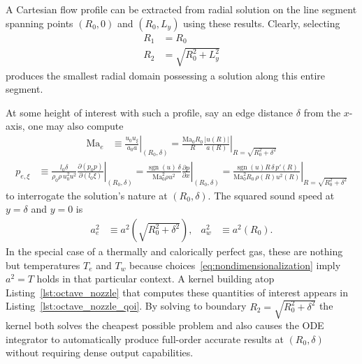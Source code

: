 \documentclass[letterpaper,11pt,nointlimits,reqno]{amsart}
\newcommand{\Mach}[1][]{\mbox{Ma}_{#1}}
\begin{document}
%
A Cartesian flow profile can be extracted from radial solution on the line
segment spanning points $\left(R_0,0\right)$ and $\left(R_0,L_y\right)$ using
these results.  Clearly, selecting
\begin{align}
  R_1 &= R_0
\\
  R_2 &= \sqrt{R_0^2 + L_y^2}
\end{align}
produces the smallest radial domain possessing a solution along this entire
segment.

At some height of interest with such a profile, say an edge distance $\delta$
from the $x$-axis, one may also compute
\begin{align}
  \Mach[e]{}
  &\equiv
  \left. \frac{u_0 u_\xi}{a_0 a} \right|_{\left(R_0,\delta\right)}
  =
  \left.
    \frac{\Mach[0]{} R_0}{R}
    \frac{\left|u\!\left(R\right)\right|}
         {      a\!\left(R\right)       }
  \right|_{R = \sqrt{R_0^2 + \delta^2}}
\end{align}
\begin{align}
  p_{e,\xi}
  &\equiv
  \left.
  \frac{l_0 \delta}{\rho_0 \rho \, u_0^2 u^2}
    \frac{\partial\left(p_0 p\right)}{\partial\left(l_0 \xi\right)}
  \right|_{\left(R_0,\delta\right)}
  =
  \left.
    \frac{\operatorname{sgn}(u) \, \delta}{\Mach[0]^2 \rho u^2}
      \frac{\partial{}p}{\partial{}x}
  \right|_{\left(R_0,\delta\right)}
  =
  \left.
    \frac{\operatorname{sgn}(u) R \, \delta \, p'\!\left(R\right)}
         {\Mach[0]^2 R_0 \, \rho\!\left(R\right) u^2\!\left(R\right)}
  \right|_{R=\sqrt{R_0^2 + \delta^2}}
\end{align}
to interrogate the solution's nature at $\left(R_0, \delta\right)$.  The squared
sound speed at $y=\delta$ and $y=0$ is
\begin{align}
  a^2_e
  &\equiv
  a^2\!\left(\sqrt{R_0^2 + \delta^2}\right)
,
&
  a^2_w
  &\equiv
  a^2\!\left(R_0\right)
.
\end{align}
In the special case of a thermally and calorically perfect gas, these are
nothing but temperatures $T_e$ and $T_w$ because
choices~\eqref{eq:nondimensionalization} imply $a^2 = T$ holds in that
particular context.  A kernel building atop Listing~\ref{lst:octave_nozzle}
that computes these quantities of interest appears in
Listing~\ref{lst:octave_nozzle_qoi}.  By solving to boundary $R_2 = \sqrt{R_0^2
+ \delta^2}$ the kernel both solves the cheapest possible problem and also
causes the ODE integrator to automatically produce full-order accurate results at
$\left(R_0,\delta\right)$ without requiring dense output capabilities.
\end{document}
